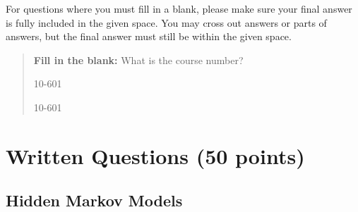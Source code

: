\documentclass[11pt,addpoints,answers]{exam}
\begin{document}
For questions where you must fill in a blank, please make sure your final answer is fully included in the given space. You may cross out answers or parts of answers, but the final answer must still be within the given space.

\begin{quote}
\textbf{Fill in the blank:} What is the course number?

\begin{tcolorbox}[fit,height=1cm, width=4cm, blank, borderline={1pt}{-2pt},nobeforeafter]
    \begin{center}\huge10-601\end{center}
    \end{tcolorbox}\hspace{2cm}
    \begin{tcolorbox}[fit,height=1cm, width=4cm, blank, borderline={1pt}{-2pt},nobeforeafter]
    \begin{center}\huge10-601\end{center}
    \end{tcolorbox}
\end{quote}

\clearpage
\clearpage
\section{Written Questions (50 points)}

\subsection{Hidden Markov Models}
\end{document}

